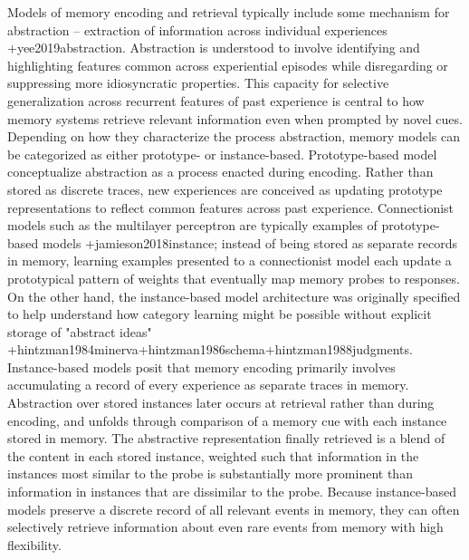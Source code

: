 Models of memory encoding and retrieval typically include some mechanism for abstraction -- extraction of information across individual experiences +{}{}{yee2019abstraction}. Abstraction is understood to involve identifying and highlighting features common across experiential episodes while disregarding or suppressing more idiosyncratic properties. This capacity for selective generalization across recurrent features of past experience is central to how memory systems retrieve relevant information even when prompted by novel cues.\markdownRendererInterblockSeparator
{}Depending on how they characterize the process abstraction, memory models can be categorized as either prototype- or instance-based. Prototype-based model conceptualize abstraction as a process enacted during encoding. Rather than stored as discrete traces, new experiences are conceived as updating prototype representations to reflect common features across past experience. Connectionist models such as the multilayer perceptron are typically examples of prototype-based models +{}{}{jamieson2018instance}; instead of being stored as separate records in memory, learning examples presented to a connectionist model each update a prototypical pattern of weights that eventually map memory probes to responses.\markdownRendererInterblockSeparator
{}On the other hand, the instance-based model architecture was originally specified to help understand how category learning might be possible without explicit storage of "abstract ideas" +{}{}{hintzman1984minerva}+{}{}{hintzman1986schema}+{}{}{hintzman1988judgments}. Instance-based models posit that memory encoding primarily involves accumulating a record of every experience as separate traces in memory. Abstraction over stored instances later occurs at retrieval rather than during encoding, and unfolds through comparison of a memory cue with each instance stored in memory. The abstractive representation finally retrieved is a blend of the content in each stored instance, weighted such that information in the instances most similar to the probe is substantially more prominent than information in instances that are dissimilar to the probe. Because instance-based models preserve a discrete record of all relevant events in memory, they can often selectively retrieve information about even rare events from memory with high flexibility.\markdownRendererInterblockSeparator
